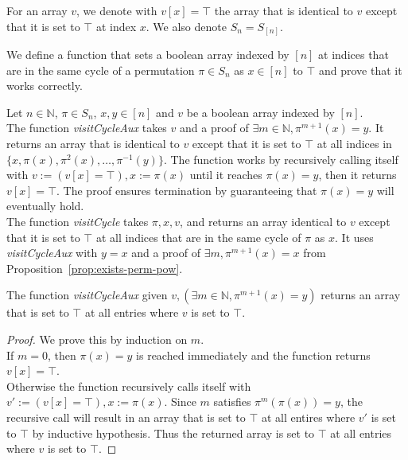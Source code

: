 For an array $v$, we denote with $v[x] = \top$ the array that is identical to $v$ except that it is set to $\top$ at index $x$. We also denote $S_n = S_{[n]}$.

We define a function that sets a boolean array indexed by $[n]$ at indices that are in the same cycle of a permutation $\pi \in S_n$ as $x \in [n]$ to $\top$ and prove that it works correctly.

\begin{definition}
  \label{def:visitCycle}
  \leanok
  Let $n \in \mathbb{N}$, $\pi \in S_n$, $x, y \in [n]$ and $v$ be a boolean array indexed by $[n]$.\\ 
  The function \emph{visitCycleAux} takes $v$ and a proof of $\exists m \in \mathbb{N}, \pi^{m + 1}(x) = y$. It returns an array that is identical to $v$ except that it is set to $\top$ at all indices in $\{x, \pi(x), \pi^2(x), \dots, \pi^{-1}(y)\}$. The function works by recursively calling itself with $v := (v[x] = \top), x := \pi(x)$ until it reaches $\pi(x) = y$, then it returns $v[x] = \top$. The proof ensures termination by guaranteeing that $\pi(x) = y$ will eventually hold.\\
  The function \emph{visitCycle} takes $\pi, x, v$, and returns an array identical to $v$ except that it is set to $\top$ at all indices that are in the same cycle of $\pi$ as $x$. It uses \emph{visitCycleAux} with $y = x$ and a proof of $\exists m, \pi^{m + 1}(x) = x$ from Proposition~\ref{prop:exists-perm-pow}.
\end{definition}

\begin{proposition}
  \label{prop:visitCycleAux-get!-true-of-get!-true}
  \leanok
  The function \emph{visitCycleAux} given $v, (\exists m \in \mathbb{N}, \pi^{m + 1}(x) = y)$ returns an array that is set to $\top$ at all entries where $v$ is set to $\top$.
\end{proposition}

\begin{proof}
  \leanok
  We prove this by induction on $m$.\\
  If $m = 0$, then $\pi(x) = y$ is reached immediately and the function returns $v[x] = \top$.\\
  Otherwise the function recursively calls itself with $v' := (v[x] = \top), x := \pi(x)$. Since $m$ satisfies $\pi^m(\pi(x)) = y$, the recursive call will result in an array that is set to $\top$ at all entires where $v'$ is set to $\top$ by inductive hypothesis. Thus the returned array is set to $\top$ at all entries where $v$ is set to $\top$.
\end{proof}

